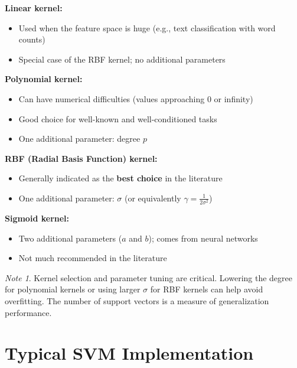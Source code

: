 \documentclass[11pt,a4paper]{article}
\theoremstyle{definition}
\theoremstyle{plain}
\theoremstyle{remark}
\newtheorem*{remark}{Note}
\begin{document}
\begin{tcolorbox}[colback=cyan!5!white,colframe=cyan!75!black,title=\textbf{Kernel Selection Guidelines}]
\textbf{Linear kernel:}
\begin{itemize}
    \item Used when the feature space is huge (e.g., text classification with word counts)
    \item Special case of the RBF kernel; no additional parameters
\end{itemize}

\textbf{Polynomial kernel:}
\begin{itemize}
    \item Can have numerical difficulties (values approaching 0 or infinity)
    \item Good choice for well-known and well-conditioned tasks
    \item One additional parameter: degree $p$
\end{itemize}

\textbf{RBF (Radial Basis Function) kernel:}
\begin{itemize}
    \item Generally indicated as the \textbf{best choice} in the literature
    \item One additional parameter: $\sigma$ (or equivalently $\gamma = \frac{1}{2\sigma^2}$)
\end{itemize}

\textbf{Sigmoid kernel:}
\begin{itemize}
    \item Two additional parameters ($a$ and $b$); comes from neural networks
    \item Not much recommended in the literature
\end{itemize}
\end{tcolorbox}

\begin{remark}
Kernel selection and parameter tuning are critical. Lowering the degree for polynomial kernels or using larger $\sigma$ for RBF kernels can help avoid overfitting. The number of support vectors is a measure of generalization performance.
\end{remark}


\section{Typical SVM Implementation}
\end{document}
